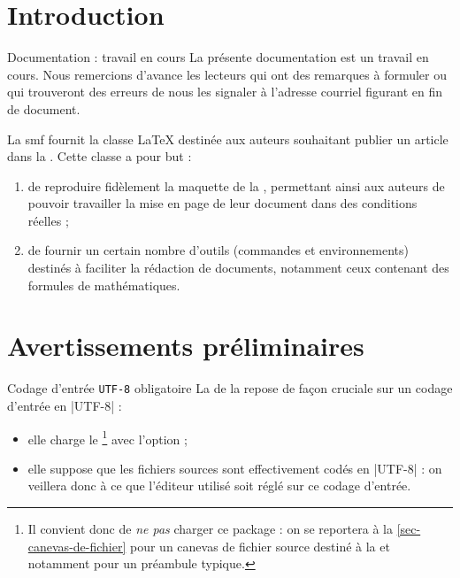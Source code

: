 \section{Introduction}
\label{sec-introduction}

\begin{dbremark}{Documentation : travail en cours}{}
  La présente documentation est un travail en cours. Nous remercions d'avance
  les lecteurs qui ont des remarques à formuler ou qui trouveront des erreurs de
  nous les signaler à l'adresse courriel figurant en fin de document.
\end{dbremark}

La \gls{smf} fournit la classe \LaTeX{} \gztauthor{} destinée aux auteurs
souhaitant publier un article dans la
\href{http://smf4.emath.fr/Publications/Gazette/}{\gzt*{}}. Cette classe a pour
but :
\begin{enumerate}
\item de reproduire fidèlement la maquette de la \gzt{}, permettant ainsi
  aux auteurs de pouvoir travailler la mise en page de leur document dans des
  conditions réelles ;
\item de fournir un certain nombre d'outils (commandes et environnements)
  destinés à faciliter la rédaction de documents, notamment ceux contenant des
  formules de mathématiques.
\end{enumerate}

\section{Avertissements préliminaires}
\label{sec:avert-prel}

\begin{dbwarning}{Codage d'entrée \protect\lstinline+UTF-8+ obligatoire}{}
  La \gztauthorcl{} de la \gzt{} repose de façon cruciale sur un codage
  d'entrée en |UTF-8| :
  \begin{itemize}
  \item elle charge le \footnote{%
      Il convient donc de \emph{ne pas} charger ce package : on se reportera
      à la \vref{sec-canevas-de-fichier} pour un canevas de fichier source
      destiné à la \gzt{} et notamment pour un préambule typique.%
    } avec l'option  ;
  \item elle suppose que les fichiers sources  sont effectivement
    codés en |UTF-8| : on veillera donc à ce que l'éditeur utilisé soit réglé
    sur ce codage d'entrée.
  \end{itemize}
\end{dbwarning}


